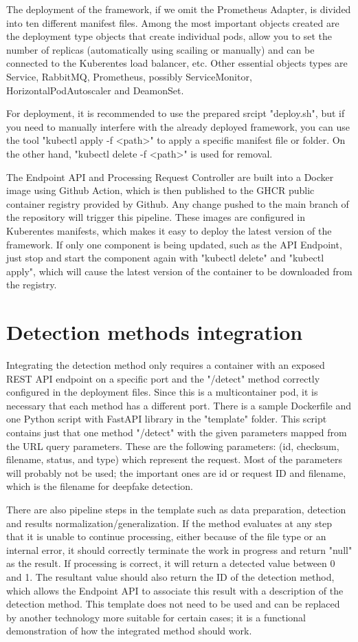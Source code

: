 The deployment of the framework, if we omit the Prometheus Adapter, is divided into ten different manifest files.  Among the most important objects created are the deployment type objects that create individual pods, allow you to set the number of replicas (automatically using scailing or manually) and can be connected to the Kuberentes load balancer, etc. Other essential objects types are Service, RabbitMQ, Prometheus, possibly ServiceMonitor, HorizontalPodAutoscaler and DeamonSet.

For deployment, it is recommended to use the prepared srcipt "deploy.sh", but if you need to manually interfere with the already deployed framework, you can use the tool "kubectl apply -f <path>" to apply a specific manifest file or folder. On the other hand, "kubectl delete -f <path>" is used for removal.

The Endpoint API and Processing Request Controller are built into a Docker image using Github Action, which is then published to the GHCR public container registry provided by Github. Any change pushed to the main branch of the repository will trigger this pipeline. These images are configured in Kuberentes manifests, which makes it easy to deploy the latest version of the framework. If only one component is being updated, such as the API Endpoint, just stop and start the component again with "kubectl delete" and "kubectl apply", which will cause the latest version of the container to be downloaded from the registry.

\chapter{Detection methods integration}

Integrating the detection method only requires a container with an exposed REST API endpoint on a specific port and the "/detect" method correctly configured in the deployment files. Since this is a multicontainer pod, it is necessary that each method has a different port. There is a sample Dockerfile and one Python script with FastAPI library in the "template" folder. This script contains just that one method "/detect" with the given parameters mapped from the URL query parameters. These are the following parameters: (id, checksum, filename, status, and type) which represent the request. Most of the parameters will probably not be used; the important ones are id or request ID and filename, which is the filename for deepfake detection.

There are also pipeline steps in the template such as data preparation, detection and results normalization/generalization. If the method evaluates at any step that it is unable to continue processing, either because of the file type or an internal error, it should correctly terminate the work in progress and return "null" as the result. If processing is correct, it will return a detected value between 0 and 1. The resultant value should also return the ID of the detection method, which allows the Endpoint API to associate this result with a description of the detection method. This template does not need to be used and can be replaced by another technology more suitable for certain cases; it is a functional demonstration of how the integrated method should work. 

